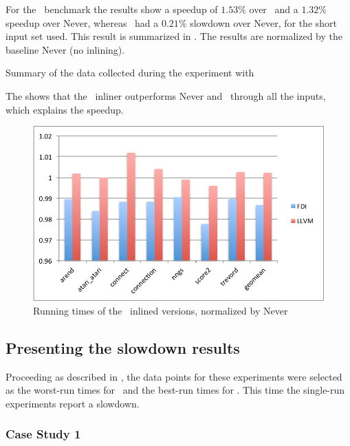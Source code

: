 For the \gobmk\ benchmark the results show a speedup of $1.53 \%$ over \llvm\, and a $1.32 \%$ speedup over Never, whereas \llvm\ had a $0.21 \%$ slowdown over Never, for the short input set used. This result is summarized in . The results are normalized by the baseline Never (no inlining).

\begin{table}
  \centering
  \begin{tiny}
  
  \end{tiny}
  \caption{Summary of the data collected during the experiment with \gobmk}
  \label{tab:speedupgobmk}
\end{table}

The  shows that the \FDI\ inliner outperforms Never and \llvm\ through all the inputs, which explains the speedup.

\begin{figure}
  \centering
  \includegraphics[width=1.00\linewidth]{Figures/speedupgbk}
  \caption{Running times of the \gobmk\ inlined versions, normalized by Never}
  \label{fig:speedupgobmk}
\end{figure}


\subsection{Presenting the slowdown results}
\label{sec:slowdown}

Proceeding as described in , the data points for these experiments were selected as the worst-run times for \FDI\ and the best-run times for \llvm. This time the single-run experiments report a slowdown.

\subsubsection{Case Study 1 \gcc}

